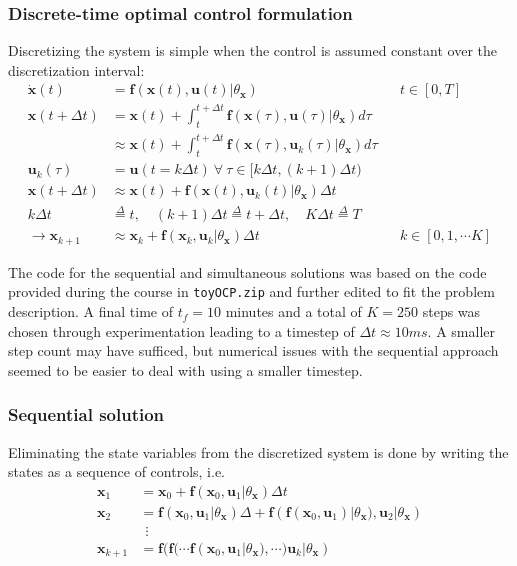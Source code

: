 \documentclass[letterpaper,12pt]{article}
\def\deleq{\overset{\Delta}{=}}
\begin{document}
\subsubsection*{Discrete-time optimal control formulation}
Discretizing the system is simple when the control is assumed constant over the discretization interval:
\begin{equation}
\begin{alignedat}{2}
	\dot{\mathbf{x}}(t) &= \mathbf{f}(\mathbf{x}(t),\mathbf{u}(t)|\theta_{\mathbf{x}})  && t \in [0,T]\\ 
	\mathbf{x}(t + \Delta t) &= \mathbf{x}(t) + \int_{t}^{t + \Delta t}\mathbf{f}(\mathbf{x}(\tau),\mathbf{u}(\tau)|\theta_{\mathbf{x}})d\tau && \\
	&\approx \mathbf{x}(t) + \int_{t}^{t + \Delta t}\mathbf{f}(\mathbf{x}(\tau),\mathbf{u}_{k}(\tau)|\theta_{\mathbf{x}})d\tau && \\ \mathbf{u}_{k}(\tau) &= \mathbf{u}(t = k\Delta t)\ \forall\ \tau \in [k\Delta t, (k + 1)\Delta t) &&	\\
	\mathbf{x}(t + \Delta t) &\approx \mathbf{x}(t) + \mathbf{f}(\mathbf{x}(t),\mathbf{u}_k(t)|\theta_{\mathbf{x}})\Delta t && \\
	k\Delta t &\deleq t, \quad (k + 1)\Delta t \deleq t + \Delta t, \quad K\Delta t \deleq T && \\
	\rightarrow \mathbf{x}_{k + 1} &\approx \mathbf{x}_k + \mathbf{f}(\mathbf{x}_k, \mathbf{u}_k| \theta_{\mathbf{x}})\Delta t &&	 k \in [0, 1, \cdots K]
\end{alignedat}
\end{equation}

The code for the sequential and simultaneous solutions was based on the code provided during the course in \texttt{toyOCP.zip} and further edited to fit the problem description. A final time of $t_f = 10$ minutes and a total of $K = 250$ steps was chosen through experimentation leading to a timestep of $\Delta t \approx 10ms$. A smaller step count may have sufficed, but numerical issues with the sequential approach seemed to be easier to deal with using a smaller timestep.


\subsubsection*{Sequential solution}
Eliminating the state variables from the discretized system is done by writing the states as a sequence of controls, i.e.
\begin{equation}
\begin{aligned}
	\mathbf{x}_{1} &= \mathbf{x}_0 + \mathbf{f}(\mathbf{x}_0, \mathbf{u}_1|\theta_{\mathbf{x}})\Delta t \\
	\mathbf{x}_{2} &= \mathbf{f}(\mathbf{x}_0, \mathbf{u}_1|\theta_{\mathbf{x}})\Delta  + \mathbf{f}(\mathbf{f}(\mathbf{x}_0, \mathbf{u}_1)|\theta_{\mathbf{x}}),\mathbf{u}_2|\theta_{\mathbf{x}}) \\
	&\ \ \vdots \\
	\mathbf{x}_{k + 1} &= \mathbf{f}(\mathbf{f}(\cdots \mathbf{f}(\mathbf{x}_0,\mathbf{u}_1|\theta_{\mathbf{x}}),\cdots)\mathbf{u}_k|\theta_{\mathbf{x}})
\end{aligned}
\end{equation}
\end{document}
